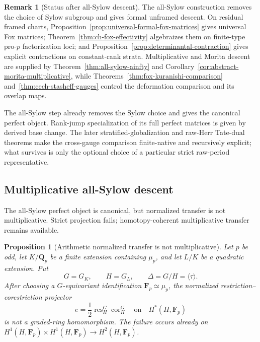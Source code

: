 \documentclass[11pt]{article}
\newtheorem{proposition}[theorem]{Proposition}
\theoremstyle{definition}
\newtheorem{remark}[theorem]{Remark}
\newcommand{\Qp}{\mathbf Q_p}
\begin{document}
\begin{remark}[Status after all-Sylow descent]\label{rem:sylow-not-global}
The all-Sylow construction removes the choice of Sylow subgroup and gives formal unframed descent.  On residual framed charts, Proposition~\ref{prop:universal-formal-fox-matrices} gives universal Fox matrices; Theorem~\ref{thm:ch-fox-effectivity} algebraizes them on finite-type pro-$p$ factorization loci; and Proposition~\ref{prop:determinantal-contraction} gives explicit contractions on constant-rank strata.  Multiplicative and Morita descent are supplied by Theorem~\ref{thm:all-sylow-ainfty} and Corollary~\ref{cor:abstract-morita-multiplicative}, while Theorems~\ref{thm:fox-kuranishi-comparison} and~\ref{thm:cech-stasheff-gauges} control the deformation comparison and its overlap maps.

The all-Sylow step already removes the Sylow choice and gives the canonical perfect object.  Rank-jump specialization of its full perfect matrices is given by derived base change.  The later stratified-globalization and raw-Herr Tate-dual theorems make the cross-gauge comparison finite-native and recursively explicit; what survives is only the optional choice of a particular strict raw-period representative.
\end{remark}


\subsection{Multiplicative all-Sylow descent}\label{subsec:all-sylow-multiplicative}

The all-Sylow perfect object is canonical, but normalized transfer is not multiplicative.  Strict projection fails; homotopy-coherent multiplicative transfer remains available.

\begin{proposition}[Arithmetic normalized transfer is not multiplicative]\label{prop:transfer-not-multiplicative}
Let $p$ be odd, let $K/\Qp$ be a finite extension containing $\mu_p$, and let $L/K$ be a quadratic extension.  Put
\[
 G=G_K,
 \qquad
 H=G_L,
 \qquad
 \Delta=G/H=\langle\tau\rangle.
\]
After choosing a $G$-equivariant identification $\mathbf F_p\simeq\mu_p$, the normalized restriction--corestriction projector
\[
 e=\frac12\operatorname{res}_{H}^{G}
 \operatorname{cor}_{H}^{G}
 \quad\text{on}\quad H^*(H,\mathbf F_p)
\]
is not a graded-ring homomorphism.  The failure occurs already on
$H^1(H,\mathbf F_p)\times H^1(H,\mathbf F_p)\to H^2(H,\mathbf F_p)$.
\end{proposition}
\end{document}
